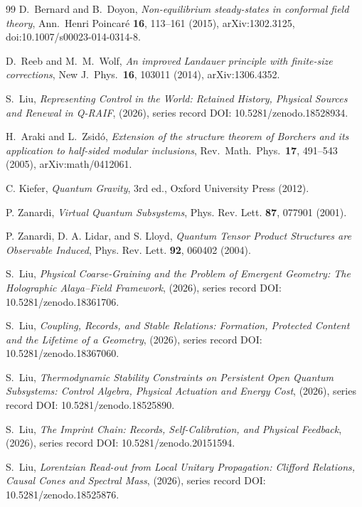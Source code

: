 \begin{thebibliography}{99}
D.~Bernard and B.~Doyon, \emph{Non-equilibrium steady-states in conformal field theory},
Ann.\ Henri Poincar\'e \textbf{16}, 113--161 (2015), arXiv:1302.3125,
doi:10.1007/s00023-014-0314-8.

D.~Reeb and M.~M.~Wolf, \emph{An improved Landauer principle with finite-size corrections}, New J.\ Phys.\ \textbf{16}, 103011 (2014), arXiv:1306.4352.

S.~Liu, \emph{Representing Control in the World: Retained History, Physical Sources and Renewal in Q-RAIF}, (2026), series record DOI: 10.5281/zenodo.18528934.

H.~Araki and L.~Zsid\'o, \emph{Extension of the structure theorem of Borchers and its application to half-sided modular inclusions}, Rev.\ Math.\ Phys.\ \textbf{17}, 491--543 (2005), arXiv:math/0412061.

C. Kiefer, \emph{Quantum Gravity}, 3rd ed., Oxford University Press (2012).

P. Zanardi, \emph{Virtual Quantum Subsystems}, Phys. Rev. Lett. \textbf{87}, 077901 (2001).

P. Zanardi, D. A. Lidar, and S. Lloyd, \emph{Quantum Tensor Product Structures are Observable Induced}, Phys. Rev. Lett. \textbf{92}, 060402 (2004).

S.~Liu, \emph{Physical Coarse-Graining and the Problem of Emergent Geometry: The Holographic Alaya--Field Framework}, (2026), series record DOI: 10.5281/zenodo.18361706.

S.~Liu, \emph{Coupling, Records, and Stable Relations: Formation, Protected Content and the Lifetime of a Geometry}, (2026), series record DOI: 10.5281/zenodo.18367060.

S.~Liu, \emph{Thermodynamic Stability Constraints on Persistent Open Quantum Subsystems: Control Algebra, Physical Actuation and Energy Cost}, (2026), series record DOI: 10.5281/zenodo.18525890.

S.~Liu, \emph{The Imprint Chain: Records, Self-Calibration, and Physical Feedback}, (2026), series record DOI: 10.5281/zenodo.20151594.

S.~Liu, \emph{Lorentzian Read-out from Local Unitary Propagation: Clifford Relations, Causal Cones and Spectral Mass}, (2026), series record DOI: 10.5281/zenodo.18525876.


\end{thebibliography}
